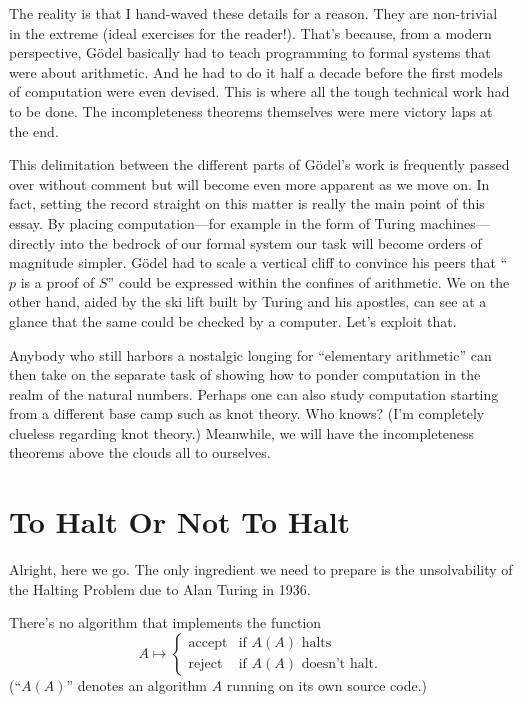 \documentclass{article}
\theoremstyle{customstyle}
\begin{document}
The reality is that I hand-waved these details for a reason. They are non-trivial in the extreme (ideal exercises for the reader!). That's because, from a modern perspective, Gödel basically had to teach programming to formal systems that were about arithmetic. And he had to do it half a decade before the first models of computation were even devised. This is where all the tough technical work had to be done. The incompleteness theorems themselves were mere victory laps at the end.

This delimitation between the different parts of Gödel's work is frequently passed over without comment but will become even more apparent as we move on. In fact, setting the record straight on this matter is really the main point of this essay. By placing computation---for example in the form of Turing machines---directly into the bedrock of our formal system our task will become orders of magnitude simpler. Gödel had to scale a vertical cliff to convince his peers that ``$p$ is a proof of $S$'' could be expressed within the confines of arithmetic. We on the other hand, aided by the ski lift built by Turing and his apostles, can see at a glance that the same could be checked by a computer. Let's exploit that.

Anybody who still harbors a nostalgic longing for ``elementary arithmetic'' can then take on the separate task of showing how to ponder computation in the realm of the natural numbers. Perhaps one can also study computation starting from a different base camp such as knot theory. Who knows? (I'm completely clueless regarding knot theory.) Meanwhile, we will have the incompleteness theorems above the clouds all to ourselves.

\section{To Halt Or Not To Halt}

Alright, here we go. The only ingredient we need to prepare is the unsolvability of the Halting Problem due to Alan Turing in 1936.

\begin{lemma}
There's no algorithm that implements the function
\[
A \mapsto
\begin{cases}
\text{accept} & \text{if $A(A)$ halts}\\
\text{reject} & \text{if $A(A)$ doesn't halt.}
\end{cases}
\]
(``$A(A)$'' denotes an algorithm $A$ running on its own source code.)
\end{lemma}
\end{document}
